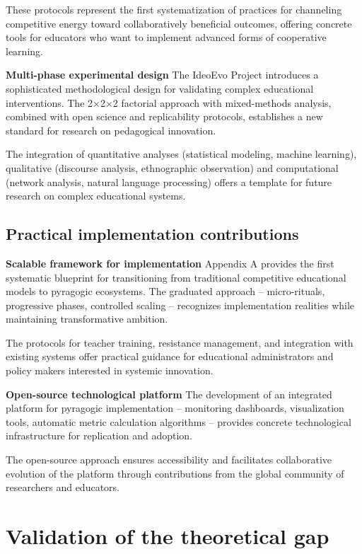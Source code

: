 These protocols represent the first systematization of practices for channeling competitive energy toward collaboratively beneficial outcomes, offering concrete tools for educators who want to implement advanced forms of cooperative learning.

\textbf{Multi-phase experimental design}
The IdeoEvo Project introduces a sophisticated methodological design for validating complex educational interventions. The 2×2×2 factorial approach with mixed-methods analysis, combined with open science and replicability protocols, establishes a new standard for research on pedagogical innovation.

The integration of quantitative analyses (statistical modeling, machine learning), qualitative (discourse analysis, ethnographic observation) and computational (network analysis, natural language processing) offers a template for future research on complex educational systems.

\subsection{Practical implementation contributions}

\textbf{Scalable framework for implementation}
Appendix A provides the first systematic blueprint for transitioning from traditional competitive educational models to pyragogic ecosystems. The graduated approach -- micro-rituals, progressive phases, controlled scaling -- recognizes implementation realities while maintaining transformative ambition.

The protocols for teacher training, resistance management, and integration with existing systems offer practical guidance for educational administrators and policy makers interested in systemic innovation.

\textbf{Open-source technological platform}
The development of an integrated platform for pyragogic implementation -- monitoring dashboards, visualization tools, automatic metric calculation algorithms -- provides concrete technological infrastructure for replication and adoption.

The open-source approach ensures accessibility and facilitates collaborative evolution of the platform through contributions from the global community of researchers and educators.

\section{Validation of the theoretical gap}

